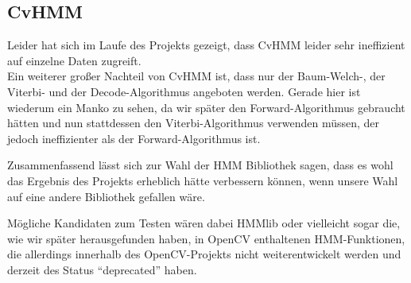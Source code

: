 \subsection{CvHMM}
\label{sec:CvHMM}
Leider hat sich im Laufe des Projekts gezeigt, dass CvHMM leider sehr ineffizient auf einzelne Daten zugreift.\\

Ein weiterer großer Nachteil von CvHMM ist, dass nur der Baum-Welch-, der Viterbi- und der Decode-Algorithmus angeboten werden.
 Gerade hier ist wiederum ein Manko zu sehen, da wir später den Forward-Algorithmus gebraucht hätten und nun stattdessen den Viterbi-Algorithmus verwenden müssen, der jedoch ineffizienter als der Forward-Algorithmus ist.

Zusammenfassend lässt sich zur Wahl der HMM Bibliothek sagen, dass es wohl das Ergebnis des Projekts erheblich hätte verbessern können, wenn unsere Wahl auf eine andere Bibliothek gefallen wäre.

Mögliche Kandidaten zum Testen wären dabei HMMlib oder vielleicht sogar die, wie wir später herausgefunden haben, in OpenCV enthaltenen HMM-Funktionen, die allerdings innerhalb des OpenCV-Projekts nicht weiterentwickelt werden und derzeit des Status “deprecated” haben.
